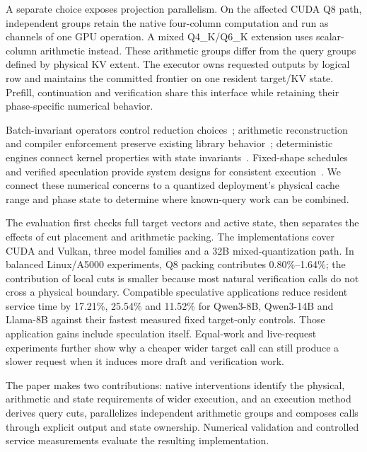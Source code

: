 A separate choice exposes projection parallelism. On the affected CUDA Q8 path, independent groups retain the native four-column computation and run as channels of one GPU operation. A mixed Q4\_K/Q6\_K extension uses scalar-column arithmetic instead. These arithmetic groups differ from the query groups defined by physical KV extent. The executor owns requested outputs by logical row and maintains the committed frontier on one resident target/KV state. Prefill, continuation and verification share this interface while retaining their phase-specific numerical behavior.

Batch-invariant operators control reduction choices~\cite{thinkingmachines}; arithmetic reconstruction and compiler enforcement preserve existing library behavior~\cite{taming}; deterministic engines connect kernel properties with state invariants~\cite{vosti}. Fixed-shape schedules and verified speculation provide system designs for consistent execution~\cite{corun,llm42}. We connect these numerical concerns to a quantized deployment's physical cache range and phase state to determine where known-query work can be combined.

The evaluation first checks full target vectors and active state, then separates the effects of cut placement and arithmetic packing. The implementations cover CUDA and Vulkan, three model families and a 32B mixed-quantization path. In balanced Linux/A5000 experiments, Q8 packing contributes 0.80\%--1.64\%; the contribution of local cuts is smaller because most natural verification calls do not cross a physical boundary. Compatible speculative applications reduce resident service time by 17.21\%, 25.54\% and 11.52\% for Qwen3-8B, Qwen3-14B and Llama-8B against their fastest measured fixed target-only controls. Those application gains include speculation itself. Equal-work and live-request experiments further show why a cheaper wider target call can still produce a slower request when it induces more draft and verification work.

The paper makes two contributions: native interventions identify the physical, arithmetic and state requirements of wider execution, and an execution method derives query cuts, parallelizes independent arithmetic groups and composes calls through explicit output and state ownership. Numerical validation and controlled service measurements evaluate the resulting implementation.
